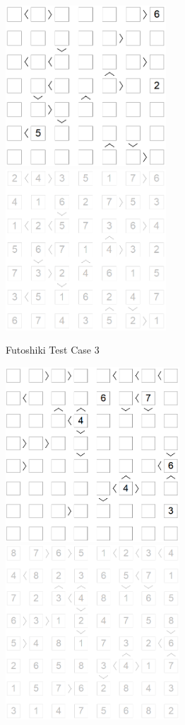 ﻿\documentclass[a4paper, 11pt]{article}
\begin{document}
\begin{enumerate}
\begin{figure}[htbp]
    \label{fig:case22}
  \end{figure}
        \begin{figure}[htbp]
    \centering
    \includegraphics[width=6cm]{Pic/f3}
    \qquad
    \includegraphics[width=6cm]{Pic/f3s}
    \caption{Futoshiki Test Case 3}
    \label{fig:case33}
  \end{figure}
        \begin{figure}[htbp]
    \centering
    \includegraphics[width=6.5cm]{Pic/f4}
    \qquad
    \includegraphics[width=6.5cm]{Pic/f4s}

\end{figure}
\end{enumerate}
\end{document}
